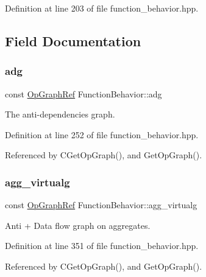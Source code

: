 Definition at line 203 of file function\+\_\+behavior.\+hpp.



\subsection{Field Documentation}
\mbox{\label{classFunctionBehavior_ab2ee4befae49706cb898593462e782f9}} 
\subsubsection{\texorpdfstring{adg}{adg}}
{\footnotesize\ttfamily const \hyperlink{op__graph_8hpp_aee97c95c40f791b60c451d9e29c72d39}{Op\+Graph\+Ref} Function\+Behavior\+::adg\hspace{0.3cm}{\ttfamily [private]}}



The anti-\/dependencies graph. 



Definition at line 252 of file function\+\_\+behavior.\+hpp.



Referenced by C\+Get\+Op\+Graph(), and Get\+Op\+Graph().

\mbox{\label{classFunctionBehavior_a3cb9aa960dfcc9f0a7bd367bf391935b}} 
\subsubsection{\texorpdfstring{agg\+\_\+virtualg}{agg\_virtualg}}
{\footnotesize\ttfamily const \hyperlink{op__graph_8hpp_aee97c95c40f791b60c451d9e29c72d39}{Op\+Graph\+Ref} Function\+Behavior\+::agg\+\_\+virtualg\hspace{0.3cm}{\ttfamily [private]}}



Anti + Data flow graph on aggregates. 



Definition at line 351 of file function\+\_\+behavior.\+hpp.



Referenced by C\+Get\+Op\+Graph(), and Get\+Op\+Graph().

